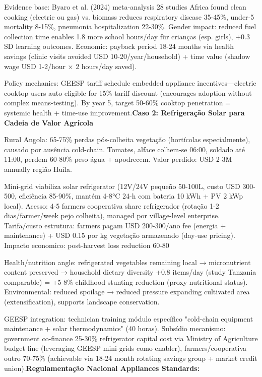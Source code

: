 \documentclass[12pt, a4paper]{article}
\begin{document}
Evidence base: Byaro et al. (2024) meta-analysis 28 studies Africa found clean cooking (electric ou gas) vs. biomass reduces respiratory disease 35-45\%, under-5 mortality 8-15\%, pneumonia hospitalization 22-30\%. Gender impact: reduced fuel collection time enables 1.8 more school hours/day für crianças (esp. girls), +0.3 SD learning outcomes. Economic: payback period 18-24 months via health savings (clinic visits avoided USD 10-20/year/household) + time value (shadow wage USD 1-2/hour × 2 hours/day saved).

Policy mechanics: GEESP tariff schedule embedded appliance incentives—electric cooktop users auto-eligible for 15\% tariff discount (encourages adoption without complex means-testing). By year 5, target 50-60\% cooktop penetration = systemic health + time-use improvement.\textbf{Caso 2: Refrigeração Solar para Cadeia de Valor Agrícola}

Rural Angola: 65-75\% perdas pós-colheita vegetação (hortícolas especialmente), causado por ausência cold-chain. Tomates, alface colhem-se 06:00, soldado até 11:00, perdem 60-80\% peso água + apodrecem. Valor perdido: USD 2-3M annually região Huíla.  

Mini-grid viabiliza solar refrigerator (12V/24V pequeño 50-100L, custo USD 300-500, eficiência 85-90\%, mantém 4-8°C 24-h com bateria 10 kWh + PV 2 kWp local). Acesso: 4-5 farmers cooperativa share refrigerador (rotação 1-2 dias/farmer/week pejo colheita), managed por village-level enterprise. Tarifa/custo estrutura: farmers pagam USD 200-300/ano fee (energia + maintenance) + USD 0.15 por kg vegetação armazenado (day-use pricing). Impacto economico: post-harvest loss reduction 60-80%

Health/nutrition angle: refrigerated vegetables remaining local → micronutrient content preserved → household dietary diversity +0.8 items/day (study Tanzania comparable) = +5-8\% childhood stunting reduction (proxy nutritional status). Environmental: reduced spoilage → reduced pressure expanding cultivated area (extensification), supports landscape conservation.

GEESP integration: technician training módulo específico "cold-chain equipment maintenance + solar thermodynamics" (40 horas). Subsídio mecanismo: government co-finance 25-30\% refrigerator capital cost via Ministry of Agriculture budget line (leveraging GEESP mini-grids como enabler), farmers/cooperativa outro 70-75\% (achievable via 18-24 month rotating savings group + market credit union).\textbf{Regulamentação Nacional Appliances Standards:}
\end{document}
